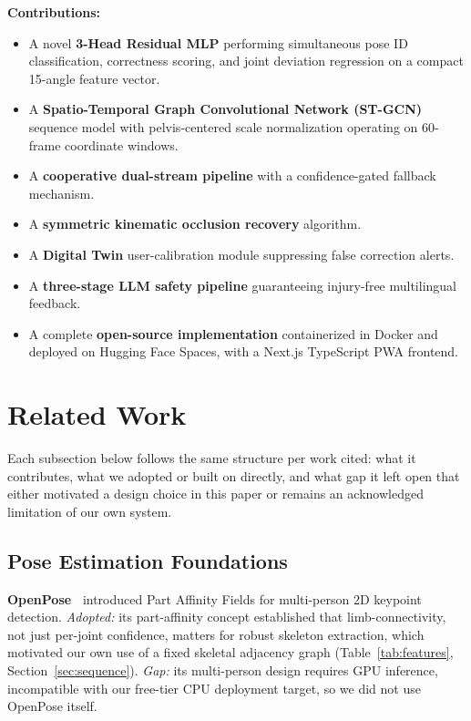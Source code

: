 \documentclass[conference]{IEEEtran}
\begin{document}
\medskip
\noindent\textbf{Contributions:}
\begin{itemize}
\item A novel \textbf{3-Head Residual MLP} performing simultaneous pose ID classification,
  correctness scoring, and joint deviation regression on a compact 15-angle feature vector.
\item A \textbf{Spatio-Temporal Graph Convolutional Network (ST-GCN)} sequence model with pelvis-centered
  scale normalization operating on 60-frame coordinate windows.
\item A \textbf{cooperative dual-stream pipeline} with a confidence-gated fallback mechanism.
\item A \textbf{symmetric kinematic occlusion recovery} algorithm.
\item A \textbf{Digital Twin} user-calibration module suppressing false correction alerts.
\item A \textbf{three-stage LLM safety pipeline} guaranteeing injury-free multilingual feedback.
\item A complete \textbf{open-source implementation} containerized in Docker and deployed
  on Hugging Face Spaces, with a Next.js TypeScript PWA frontend.
\end{itemize}

\section{Related Work}
\label{sec:related}

Each subsection below follows the same structure per work cited: what it
contributes, what we adopted or built on directly, and what gap it left open
that either motivated a design choice in this paper or remains an acknowledged
limitation of our own system.

\subsection{Pose Estimation Foundations}

\textbf{OpenPose~\cite{openpose2019}} introduced Part Affinity Fields for
multi-person 2D keypoint detection. \emph{Adopted:} its part-affinity concept
established that limb-connectivity, not just per-joint confidence, matters for
robust skeleton extraction, which motivated our own use of a fixed skeletal
adjacency graph (Table~\ref{tab:features}, Section~\ref{sec:sequence}).
\emph{Gap:} its multi-person design requires GPU inference, incompatible with
our free-tier CPU deployment target, so we did not use OpenPose itself.
\end{document}
